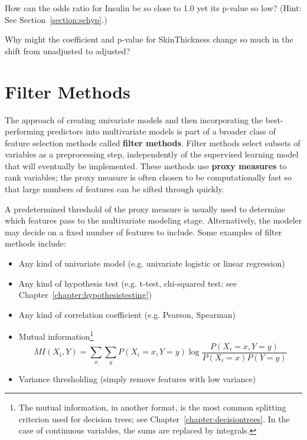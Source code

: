 \begin{question}{}
How can the odds ratio for Insulin be so close to 1.0 yet its p-value so low? (Hint: See Section~\ref{section:sehyp}.)
\end{question}

\begin{question}{}
Why might the coefficient and p-value for SkinThickness change so much in the shift from unadjusted to adjusted? 
\end{question}


\section{Filter Methods}

The approach of creating univariate models and then incorporating the best-performing predictors into multivariate models is part of a broader class of feature selection methods called \textbf{filter methods}. Filter methods select subsets of variables as a preprocessing step, independently of the  supervised learning model that will eventually be implemented. These methods use \textbf{proxy measures} to rank variables; the proxy measure is often chosen to be computationally fast so that large numbers of features can be sifted through quickly.

A predetermined threshold of the proxy measure is usually used to determine which features pass to the multivariate modeling stage. Alternatively, the modeler may decide on a fixed number of features to include. Some examples of filter methods include:

\begin{itemize}
\item Any kind of univariate model (e.g. univariate logistic or linear regression)
\item Any kind of hypothesis test (e.g. t-test, chi-squared test; see Chapter~\ref{chapter:hypothesistesting})
\item Any kind of correlation coefficient (e.g. Pearson, Spearman)
\item Mutual information\footnote{The mutual information, in another format, is the most common splitting criterion used for decision trees; see Chapter~\ref{chapter:decisiontrees}. In the case of continuous variables, the sums are replaced by integrals.} 
$$ MI(X_i,Y) = \sum_x \sum_y P(X_i = x, Y = y) \log \frac{P(X_i = x, Y = y)}{P(X_i = x) P(Y = y)} $$
\item Variance thresholding (simply remove features with low variance)
\end{itemize}

